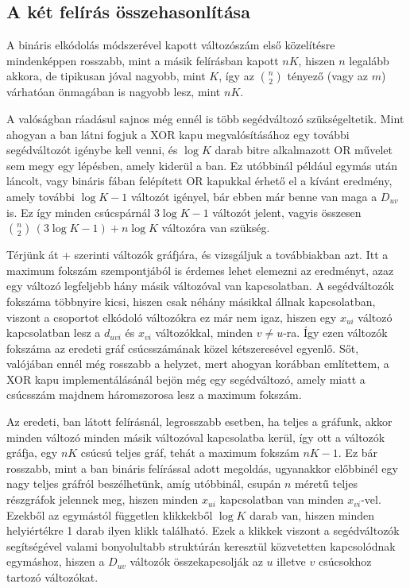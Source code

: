 \subsection{A két felírás összehasonlítása}\label{sec:theoryonehotVSbinary}

A bináris elkódolás módszerével kapott változószám első közelítésre mindenképpen rosszabb, mint a másik felírásban kapott $nK$, hiszen $n$ legalább akkora, de tipikusan jóval nagyobb, mint $K$, így az $\binom{n}{2}$ tényező (vagy az $m$) várhatóan önmagában is nagyobb lesz, mint $nK$.

A valóságban ráadásul sajnos még ennél is több segédváltozó szükségeltetik. Mint ahogyan a ban látni fogjuk a XOR kapu megvalósításához egy további segédváltozót igénybe kell venni, és $\log K$ darab bitre alkalmazott OR művelet sem megy egy lépésben, amely kiderül a ban. Ez utóbbinál például egymás után láncolt, vagy bináris fában felépített OR kapukkal érhető el a kívánt eredmény, amely további $\log K -1$ változót igényel, bár ebben már benne van maga a $D_{uv}$ is. Ez így minden csúcspárnál $3\log K - 1$ változót jelent, vagyis összesen $\binom{n}{2} \, (3\log K -  1 ) + n \log K$ változóra van szükség.
 
Térjünk át \az+ szerinti változók gráfjára, és vizsgáljuk a továbbiakban azt.
Itt a maximum fokszám szempontjából is érdemes lehet elemezni az eredményt, azaz egy változó legfeljebb hány másik változóval van kapcsolatban. A segédváltozók fokszáma többnyire kicsi, hiszen csak néhány másikkal állnak kapcsolatban, viszont a csoportot elkódoló változókra ez már nem igaz, hiszen egy $x_{ui}$ változó kapcsolatban lesz a $d_{uvi}$ és $x_{vi}$ változókkal, minden $v \neq u$-ra. Így ezen változók fokszáma az eredeti gráf csúcsszámának közel kétszeresével egyenlő. Sőt, valójában ennél még rosszabb a helyzet, mert ahogyan korábban említettem, a XOR kapu implementálásánál bejön még egy segédváltozó, amely miatt a csúcsszám majdnem háromszorosa lesz a maximum fokszám.

 
Az eredeti, ban látott felírásnál, legrosszabb esetben, ha teljes a gráfunk, akkor minden változó minden másik változóval kapcsolatba kerül, így ott a változók gráfja, egy $nK$ csúcsú teljes gráf, tehát a maximum fokszám  $nK -1$. Ez bár rosszabb, mint a ban bináris felírással adott megoldás, ugyanakkor előbbinél egy nagy teljes gráfról beszélhetünk, amíg utóbbinál, csupán $n$ méretű teljes részgráfok jelennek meg, hiszen minden $x_{ui}$ kapcsolatban van minden $x_{vi}$-vel. Ezekből az egymástól független klikkekből $\log K$ darab van, hiszen minden helyiértékre 1 darab ilyen klikk található. Ezek a klikkek viszont a segédváltozók segítségével valami bonyolultabb struktúrán keresztül közvetetten kapcsolódnak egymáshoz, hiszen a $D_{uv}$ változók összekapcsolják az $u$ illetve $v$ csúcsokhoz tartozó változókat.


